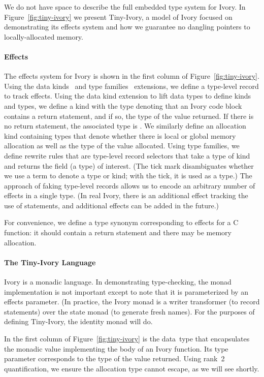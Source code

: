 We do not have space to describe the full embedded type system for Ivory.  In
Figure~\ref{fig:tiny-ivory} we present Tiny-Ivory, a model of Ivory focused on
demonstrating its effects system and how we guarantee no dangling pointers to
locally-allocated memory.

\paragraph{Effects}
The effects system for Ivory is shown in the first column of
Figure~\ref{fig:tiny-ivory}.  Using the data kinds~\cite{datakinds} and type
families~\cite{typefamilies} extensions, we define a type-level record to track
effects.  Using the data kind extension to lift data types to define kinds and
types, we define a kind  with the type  denoting that an
Ivory code block contains a return statement, and if so, the type of the value
returned.  If there is no return statement, the associated type is .
We similarly define an allocation kind containing types that denote whether
there is local or global memory allocation as well as the type of the value
allocated.  Using type families, we define rewrite rules that are type-level
record selectors that take a type of kind  and returns the field (a
type) of interest.  (The tick mark disambiguates whether we use a term to denote
a type or kind; with the tick, it is used as a type.)  The approach of faking
type-level records allows us to encode an arbitrary number of effects in a
single type.  (In real Ivory, there is an additional effect tracking the use of
 statements, and additional effects can be added in the future.)

For convenience, we define a type synonym  corresponding to
effects for a C function: it should contain a return statement and there may be
memory allocation.

\paragraph{The Tiny-Ivory Language}
Ivory is a monadic language.  In demonstrating type-checking, the monad
implementation is not important except to note that it is parameterized by an
effects parameter.  (In practice, the Ivory monad is a writer transformer (to
record statements) over the state monad (to generate fresh names).  For the
purposes of defining Tiny-Ivory, the identity monad will do.

In the first column of Figure~\ref{fig:tiny-ivory} is the  data~type
that encapsulates the monadic value implementing the body of an Ivory function.
Its type parameter corresponds to the type of the value returned.  Using rank~2
quantification, we ensure the allocation type cannot escape, as we will see shortly.

